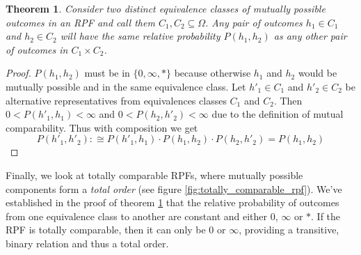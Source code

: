 \documentclass[twoside]{article}
\theoremstyle{plain}%
\newtheorem{theorem}{Theorem}[section]
\theoremstyle{definition}
\theoremstyle{remark}
\begin{document}
\begin{theorem}
\label{thm:equivalence_class_same}
Consider two distinct equivalence classes of mutually possible outcomes in an RPF and call them \(C_1, C_2 \subseteq \Omega\). Any pair of outcomes \(h_1 \in C_1\) and \(h_2 \in C_2\) will have the same relative probability \(P(h_1, h_2)\) as any other pair of outcomes in \(C_1 \times C_2\). 
\end{theorem}

\begin{proof}
\(P(h_1, h_2)\) must be in \(\{0, \infty, \ast\}\) because otherwise \(h_1\) and \(h_2\) would be mutually possible and in the same equivalence class. Let \(h'_1 \in C_1\) and \(h'_2 \in C_2\) be alternative representatives from equivalences classes \(C_1\) and \(C_2\). Then \(0 < P(h'_1, h_1) < \infty\) and \(0 < P(h_2, h'_2) < \infty\) due to the definition of mutual comparability. Thus with composition we get
\[P(h'_1, h'_2) :\cong P(h'_1, h_1) \cdot P(h_1, h_2) \cdot P(h_2, h'_2) = P(h_1, h_2)\]
\end{proof}

Finally, we look at totally comparable RPFs, where mutually possible components form a \textit{total order} (see figure \ref{fig:totally_comparable_rpf}). We've established in the proof of theorem \ref{thm:equivalence_class_same} that the relative probability of outcomes from one equivalence class to another are constant and either 0, \(\infty\) or \(\ast\). If the RPF is totally comparable, then it can only be 0 or \(\infty\), providing a transitive, binary relation and thus a total order.
\end{document}
